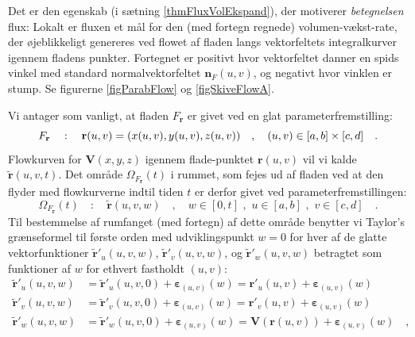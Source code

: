 \begin{aha}
Det er den egenskab (i sætning \ref{thmFluxVolEkspand}), der motiverer \emph{betegnelsen} flux: Lokalt er fluxen et mål for den (med fortegn regnede) volumen-vækst-rate, der øjeblikkeligt genereres ved flowet af fladen langs vektorfeltets integralkurver igennem fladens punkter. Fortegnet er positivt hvor vektorfeltet danner en spids vinkel med standard normalvektorfeltet $\mathbf{n}_{F}(u,v)$, og negativt hvor vinklen er stump. Se figurerne \ref{figParabFlow} og \ref{figSkiveFlowA}.
\end{aha}


\begin{bevis}
Vi antager som vanligt, at fladen $F_{\mathbf{r}}$ er givet ved en glat parameterfremstilling:
\begin{equation}
F_{\bf r}\quad : \quad \mathbf{r}(u,v) = (x(u,v), y(u,v), z(u,v))\quad , \quad (u,v) \in [a,b] \times [c,d] \quad .
\end{equation}
Flowkurven for $\mathbf{V}(x,y,z)$ igennem flade-punktet $\mathbf{r}(u,v)$ vil vi kalde $\tilde{\mathbf{r}}(u,v,t)$. Det område $\Omega_{F_{\mathbf{r}}}(t)$ i rummet, som fejes ud af fladen ved at den flyder med flowkurverne indtil tiden $t$ er derfor givet ved parameterfremstillingen:
\begin{equation}
\Omega_{F_{\mathbf{r}}}(t) \quad : \quad \tilde{\mathbf{r}}(u,v,w)\quad , \quad w \in [0, t] \,\, ,  \, \, u \in [a,b] \,\, ,  \, \, v \in [c, d] \quad .
\end{equation}
Til bestemmelse af rumfanget (med fortegn) af dette område benytter vi Taylor's grænseformel til første orden med udviklingspunkt $w=0$ for hver af de glatte vektorfunktioner $\tilde{\mathbf{r}}'_{u}(u,v,w)$, $\tilde{\mathbf{r}}'_{v}(u,v,w)$, og $\tilde{\mathbf{r}}'_{w}(u,v,w)$ betragtet som funktioner af $w$ for ethvert fastholdt $(u,v)$:
\begin{equation}
\begin{aligned}
\tilde{\mathbf{r}}'_{u}(u,v,w) &= \tilde{\mathbf{r}}'_{u}(u,v,0) + \bm{\varepsilon}_{(u,v)}(w)
= \mathbf{r}'_{u}(u,v) + \bm{\varepsilon}_{(u,v)}(w) \\
\tilde{\mathbf{r}}'_{v}(u,v,w) &= \tilde{\mathbf{r}}'_{v}(u,v,0) + \bm{\varepsilon}_{(u,v)}(w)
= \mathbf{r}'_{v}(u,v) + \bm{\varepsilon}_{(u,v)}(w) \\
\tilde{\mathbf{r}}'_{w}(u,v,w) &= \tilde{\mathbf{r}}'_{w}(u,v,0) + \bm{\varepsilon}_{(u,v)}(w)
= \mathbf{V}(\mathbf{r}(u,v)) + \bm{\varepsilon}_{(u,v)}(w) \quad ,
\end{aligned}

\end{equation}
\end{bevis}
